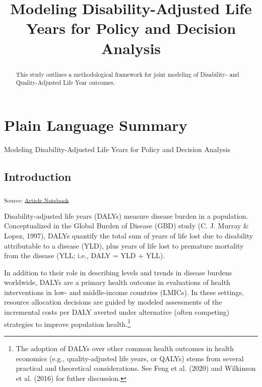 \documentclass[
]{agujournal2019}
\begin{document}
\title{Modeling Disability-Adjusted Life Years for Policy and Decision
Analysis}

\authors{}




\begin{abstract}
This study outlines a methodological framework for joint modeling of
Disability- and Quality-Adjusted Life Year outcomes.
\end{abstract}

\section*{Plain Language Summary}
Modeling Disability-Adjusted Life Years for Policy and Decision Analysis



\subsection{Introduction}\label{sec-introduction}

\textsubscript{Source:
\href{https://graveja0.github.io/dalys/index.qmd.html}{Article
Notebook}}

Disability-adjusted life years (DALYs) measure disease burden in a
population. Conceptualized in the Global Burden of Disease (GBD) study
(C. J. Murray \& Lopez, 1997), DALYs quantify the total sum of years of
life lost due to disability attributable to a disease (YLD), plus years
of life lost to premature mortality from the disease (YLL; i.e., DALY =
YLD + YLL).

In addition to their role in describing levels and trends in disease
burdens worldwide, DALYs are a primary health outcome in evaluations of
health interventions in low- and middle-income countries (LMICs). In
these settings, resource allocation decisions are guided by modeled
assessments of the incremental costs per DALY averted under alternative
(often competing) strategies to improve population health.\footnote{The
  adoption of DALYs over other common health outcomes in health
  economics (e.g., quality-adjusted life years, or QALYs) stems from
  several practical and theoretical considerations. See Feng et al.
  (2020) and Wilkinson et al. (2016) for futher discussion.}
\end{document}
